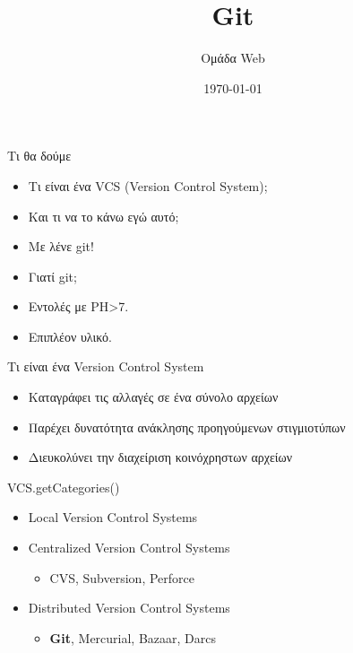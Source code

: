 \documentclass{beamer}
\title{Git}
\author{
Ομάδα Web}
\date{\today}
\begin{document}
\begin{frame}
\begin{minipage}{\hsize}
\centering
\end{minipage}
\titlepage
\end{frame}

\begin{frame}{Τι θα δούμε}
  \begin{itemize}
   \item Τι είναι ένα VCS (Version Control System);
   \pause
   \item Και τι να το κάνω εγώ αυτό;
   \pause
   \item Με λένε git!
   \pause
   \item Γιατί git;
   \pause
   \item Εντολές με PH>7.
   \pause
   \item Επιπλέον υλικό.
  \end{itemize}
\end{frame}

\begin{frame}{Τι είναι ένα Version Control System}
  \begin{itemize}
    \item Καταγράφει τις αλλαγές σε ένα σύνολο αρχείων
    \item Παρέχει δυνατότητα ανάκλησης προηγούμενων στιγμιοτύπων
    \item Διευκολύνει την διαχείριση κοινόχρηστων αρχείων
  \end{itemize}
\end{frame}

\begin{frame}{VCS.getCategories()}
  \begin{itemize}
    \item Local Version Control Systems
    \item Centralized Version Control Systems
    \begin{itemize}
      \item CVS, Subversion, Perforce
    \end{itemize}
    \item Distributed Version Control Systems
    \begin{itemize}
      \item \textbf{Git}, Mercurial, Bazaar, Darcs
    \end{itemize}
  \end{itemize}
\end{frame}
\end{document}
